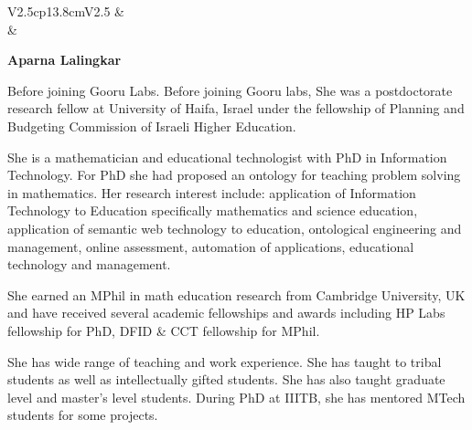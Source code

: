 \noindent
\begin{tabular}{V{2.5}cp{13.8cm}V{2.5}}
 &\\
 & 

\centerline{\large\bf Aparna Lalingkar}

\bigskip
Before joining Gooru Labs. Before joining Gooru labs, She was a postdoctorate research fellow at University of Haifa, Israel under the fellowship of Planning and Budgeting Commission of Israeli Higher Education.

\bigskip

She is a mathematician and educational technologist with PhD in Information Technology. For PhD she had proposed an ontology for teaching problem solving in mathematics. Her research interest include: application of Information Technology to Education specifically mathematics and science education, application of semantic web technology to education, ontological engineering and management, online assessment, automation of applications, educational technology and management.

\bigskip

She earned an MPhil in math education research from Cambridge University, UK and have received several academic fellowships and awards including HP Labs fellowship for PhD, DFID \& CCT fellowship for MPhil.

\bigskip

She has wide range of teaching and work experience. She has taught to tribal students as well as intellectually gifted students. She has also taught graduate level and master’s level students. During PhD at IIITB, she has mentored MTech students for some projects.\\


\end{tabular}

